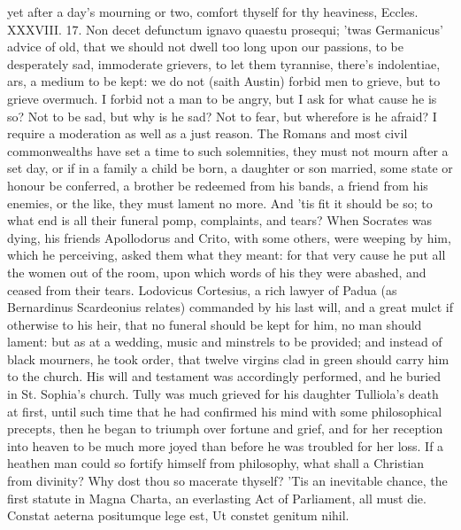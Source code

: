 {yet after a day's mourning or two, comfort thyself for thy heaviness,
Eccles. XXXVIII. 17. Non decet defunctum ignavo quaestu prosequi;
'twas Germanicus' advice of old, that we should not dwell too long upon
our passions, to be desperately sad, immoderate grievers, to let them
tyrannise, there's indolentiae, ars, a medium to be kept: we do not
(saith Austin) forbid men to grieve, but to grieve overmuch. I
forbid not a man to be angry, but I ask for what cause he is so? Not to
be sad, but why is he sad? Not to fear, but wherefore is he afraid? I
require a moderation as well as a just reason. The Romans and
most civil commonwealths have set a time to such solemnities, they must
not mourn after a set day, or if in a family a child be born, a
daughter or son married, some state or honour be conferred, a brother
be redeemed from his bands, a friend from his enemies, or the like,
they must lament no more. And 'tis fit it should be so; to what end is
all their funeral pomp, complaints, and tears? When Socrates was dying,
his friends Apollodorus and Crito, with some others, were weeping by
him, which he perceiving, asked them what they meant: for that
very cause he put all the women out of the room, upon which words of
his they were abashed, and ceased from their tears. Lodovicus
Cortesius, a rich lawyer of Padua (as  Bernardinus Scardeonius
relates) commanded by his last will, and a great mulct if otherwise to
his heir, that no funeral should be kept for him, no man should lament:
but as at a wedding, music and minstrels to be provided; and instead of
black mourners, he took order, that twelve virgins clad in green
should carry him to the church. His will and testament was accordingly
performed, and he buried in St. Sophia's church. Tully was much
grieved for his daughter Tulliola's death at first, until such time
that he had confirmed his mind with some philosophical precepts,
then he began to triumph over fortune and grief, and for her
reception into heaven to be much more joyed than before he was troubled
for her loss. If a heathen man could so fortify himself from
philosophy, what shall a Christian from divinity? Why dost thou so
macerate thyself? 'Tis an inevitable chance, the first statute in Magna
Charta, an everlasting Act of Parliament, all must die.
Constat aeterna positumque lege est,
Ut constet genitum nihil.

}
